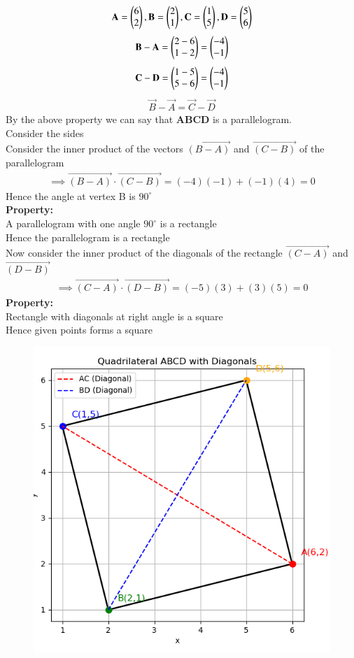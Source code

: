 \documentclass[journal,12pt,onecolumn]{IEEEtran}
\begin{document}
		\begin{align}
			\mathbf{A} = \begin{pmatrix}6\\2\end{pmatrix} ,\mathbf{B}=\begin{pmatrix}2\\1\end{pmatrix} ,\mathbf{C}=\begin{pmatrix}1\\5\end{pmatrix} , \mathbf{D}=\begin{pmatrix}5\\6\end{pmatrix}
		\end{align}
		\begin{align}
		    \mathbf{B}-\mathbf{A}=\begin{pmatrix}2-6\\1-2\end{pmatrix}=\begin{pmatrix}-4\\-1\end{pmatrix}
		\end{align}
        \begin{align}
            \mathbf{C}-\mathbf{D}=\begin{pmatrix}1-5\\5-6\end{pmatrix}=\begin{pmatrix}-4\\-1\end{pmatrix}
        \end{align}
        \begin{align}
            \vec{B}-\vec{A}=\vec{C}-\vec{D}
        \end{align}
        By the above property we can say that \textbf{ABCD} is a parallelogram.\\
        Consider the sides\\
      Consider the inner product of the vectors $\vec{(B-A)}$ and $\vec{(C-B)}$ of the parallelogram\\
      \begin{align}
          \implies \vec{(B-A)} \cdot \vec{(C-B)}=(-4)(-1)+(-1)(4)=0
      \end{align}
          Hence the angle at vertex B is $90^\circ$\\
      \textbf{Property:}\\
      A parallelogram with one angle $90^\circ$ is a rectangle\\
      Hence the parallelogram is a rectangle\\
      Now consider the inner product of the diagonals of the rectangle $\vec{(C-A)}$ and $\vec{(D-B)}$\\ 
      \begin{align}
         \implies \vec{(C-A)} \cdot \vec{(D-B)}=(-5)(3)+(3)(5)=0
      \end{align}
      \textbf{Property:}\\
      Rectangle with diagonals at right angle is a square\\
      Hence given points forms a square\\
      \begin{figure}[H]
          \centering
          \includegraphics[width=0.7\linewidth]{figs/fig1.png}
	      \caption{}
	      \label{fig}
      \end{figure}
\end{document}
